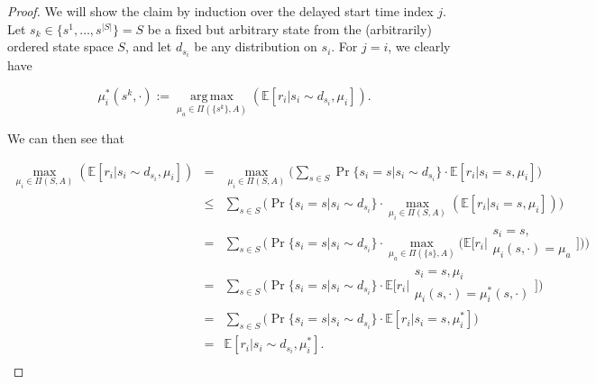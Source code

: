 \documentclass[11pt]{article} %
\DeclareMathOperator*{\argmax}{arg\,max}
\begin{document}
\begin{proof}

We will show the claim by induction over the delayed start time index $j$. Let $s_k \in \{ s^1,\dots,s^{|S|}\} = S$ be a fixed but arbitrary state from the (arbitrarily) ordered state space $S$, and let $d_{s_i}$ be any distribution on $s_i$. For $j=i$, we clearly have

\begin{equation}
	\mu_i^*(s^k,\cdot) := \argmax\limits_{\mu_a \in \Pi(\{s^k\},A)} ( \mathbb{E}[ r_i | s_i \sim d_{s_i}, \mu_i ] ).
\end{equation}

We can then see that

\begin{equation}
	\begin{array}{rcl}
		\max\limits_{\mu_i \in \Pi(S,A)} ( \mathbb{E}[ r_i | s_i \sim d_{s_i}, \mu_i ] ) 	& = 	& \max\limits_{\mu_i \in \Pi(S,A)} \Big( \sum\limits_{s \in S} \Pr\{ s_i = s | s_i \sim d_{s_i} \} \cdot \mathbb{E}[ r_i | s_i = s, \mu_i ] \Big) \\
																					& \le 	& \sum\limits_{s \in S} \Big( \Pr\{ s_i = s | s_i \sim d_{s_i} \} \cdot \max\limits_{\mu_i \in \Pi(S,A)} (\mathbb{E}[ r_i | s_i = s, \mu_i ]) \Big) \\
																					& = 	& \sum\limits_{s \in S} \Big( \Pr\{ s_i = s | s_i \sim d_{s_i} \} \cdot \max\limits_{\mu_a \in \Pi(\{s\},A)} \Big(\mathbb{E}\Big[ r_i \Big| \begin{array}{c}
																																																	s_i = s, \\
																																																	\mu_i(s,\cdot) = \mu_a
																																																\end{array} \Big] \Big) \Big) \\
																					& =		& \sum\limits_{s \in S} \Big( \Pr\{ s_i = s | s_i \sim d_{s_i} \} \cdot \mathbb{E}\Big[ r_i \Big| \begin{array}{c}
																																										s_i = s, \mu_i \\
																																										\mu_i(s,\cdot) = \mu_i^*(s,\cdot)
																																									\end{array} \Big] \Big) \\
																					& =		& \sum\limits_{s \in S} \Big( \Pr\{ s_i = s | s_i \sim d_{s_i} \} \cdot \mathbb{E}[ r_i | s_i = s, \mu_i^* ] \Big) \\
																					& =		&  \mathbb{E}[ r_i | s_i \sim d_{s_i}, \mu_i^* ]. \\
	\end{array}
\end{equation}


\end{proof}
\end{document}
